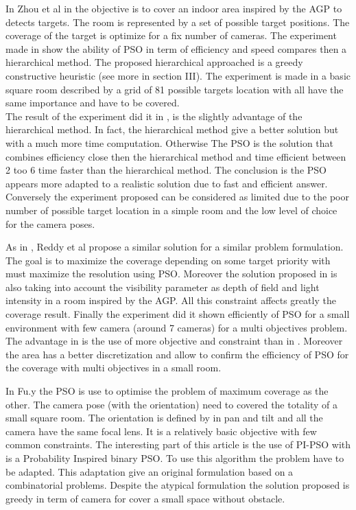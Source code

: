 In Zhou et al in \cite{8*zhou2011} the objective is to cover an indoor area inspired by the AGP to detects targets. The room is represented by a set of possible target positions. The coverage of the target is optimize for a fix number of cameras. 
 The experiment made in \cite{8*zhou2011} show the ability of PSO in term of efficiency and speed compares then a hierarchical method. The proposed hierarchical approached is a greedy constructive heuristic (see more in \cite{8*zhou2011} section III). The experiment is made in a basic square room described by a grid of 81 possible targets location with all have the same importance and have to be covered. \\
The result of the experiment did it in \cite{8*zhou2011}, is the slightly advantage of the hierarchical method. In fact, the hierarchical method give a better solution but with a much more time computation. Otherwise The PSO is the solution that combines efficiency close then the hierarchical method and time efficient between 2 too 6 time faster than the hierarchical method. The conclusion is the PSO appears more adapted to a realistic solution due to fast and efficient answer. Conversely the experiment proposed can be considered as limited due to the  poor  number of possible target location in a simple room and the low level of choice for the camera poses.

As in \cite{8*zhou2011}, Reddy et al \cite{33*reddy2012} propose a similar solution for a similar problem formulation. The goal is to maximize the coverage depending on some target priority with must maximize the resolution using PSO.
Moreover the solution proposed in \cite{33*reddy2012} is also taking into account the visibility parameter as depth of field and light intensity in a room inspired by the AGP. All this constraint affects greatly the coverage result. Finally the experiment did it  shown efficiently of PSO for a small environment with few camera (around 7 cameras) for a multi objectives problem. The advantage in \cite{33*reddy2012} is the use of more objective and constraint than in \cite{8*zhou2011}. Moreover the area has a better discretization and allow to confirm the efficiency of PSO for the coverage with multi objectives in a small room.

In Fu.y \cite{193*fu2014} the PSO is use to optimise the problem of maximum coverage as the other. 
 The camera pose (with the orientation) need to covered the totality of a small square room.
 The orientation is defined by in pan and tilt and all the camera have the same focal lens. It is a relatively basic objective with few common constraints. 
 The interesting part of this article is the use of PI-PSO with is a Probability Inspired binary PSO. 
 To use this algorithm the problem have to be adapted. This adaptation give an original formulation based on a combinatorial problems. Despite the atypical formulation the solution proposed is greedy in term of camera for cover a small space without obstacle. 
 
